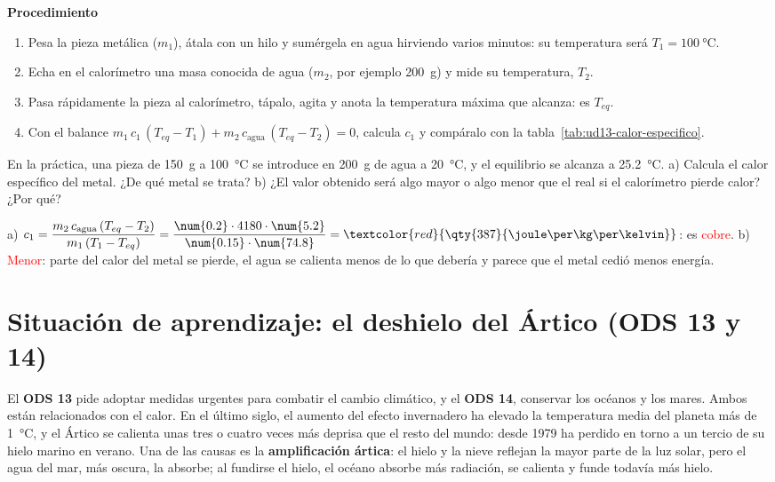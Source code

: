 \textbf{Procedimiento}
\begin{enumerate}[label=\numberballgreen]
    \item Pesa la pieza metálica (\(m_1\)), átala con un hilo y sumérgela en agua hirviendo varios minutos: su temperatura será
    \(T_1 = \qty{100}{\degreeCelsius}\).
    \item Echa en el calorímetro una masa conocida de agua (\(m_2\), por ejemplo \qty{200}{\g}) y mide su temperatura, \(T_2\).
    \item Pasa rápidamente la pieza al calorímetro, tápalo, agita y anota la temperatura máxima que alcanza: es \(T_{eq}\).
    \item Con el balance \(m_1\,c_1\,(T_{eq} - T_1) + m_2\,c_{\text{agua}}\,(T_{eq} - T_2) = 0\), calcula \(c_1\) y compáralo con la
    tabla~\ref{tab:ud13-calor-especifico}.
\end{enumerate}

\begin{exercise}
    En la práctica, una pieza de \qty{150}{\g} a \qty{100}{\degreeCelsius} se introduce en \qty{200}{\g} de agua a \qty{20}{\degreeCelsius},
    y el equilibrio se alcanza a \qty{25.2}{\degreeCelsius}. a) Calcula el calor específico del metal. ¿De qué metal se trata? b) ¿El
    valor obtenido será algo mayor o algo menor que el real si el calorímetro pierde calor? ¿Por qué?
    \begin{solu}
        a) \(c_1 = \dfrac{m_2\,c_{\text{agua}}\,(T_{eq} - T_2)}{m_1\,(T_1 - T_{eq})} = \dfrac{\num{0.2} \cdot 4180 \cdot \num{5.2}}{\num{0.15}
        \cdot \num{74.8}} = \textcolor{red}{\qty{387}{\joule\per\kg\per\kelvin}}\): es \textcolor{red}{cobre}. b)
        \textcolor{red}{Menor}: parte del calor del metal se pierde, el agua se calienta menos de lo que debería y parece que el metal
        cedió menos energía.
    \end{solu}
\end{exercise}

\section{Situación de aprendizaje: el deshielo del Ártico (ODS 13 y 14)}\label{sec:ud13-ods}

El \textbf{ODS 13} pide adoptar medidas urgentes para combatir el cambio climático, y el \textbf{ODS 14}, conservar los océanos y los
mares. Ambos están relacionados con el calor. En el último siglo, el aumento del efecto invernadero ha elevado la temperatura media
del planeta más de \qty{1}{\degreeCelsius}, y el Ártico se calienta unas tres o cuatro veces más deprisa que el resto del mundo: desde
1979 ha perdido en torno a un tercio de su hielo marino en verano. Una de las causas es la \textbf{amplificación ártica}: el hielo y
la nieve reflejan la mayor parte de la luz solar, pero el agua del mar, más oscura, la absorbe; al fundirse el hielo, el océano
absorbe más radiación, se calienta y funde todavía más hielo.

